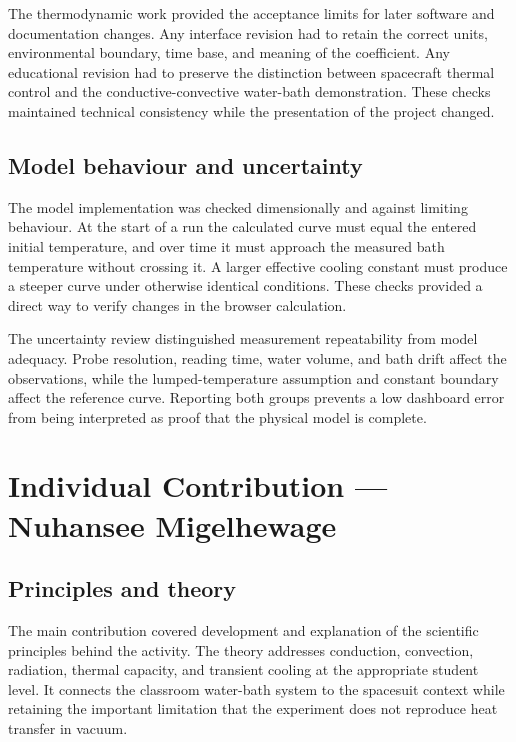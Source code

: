 \documentclass[10pt,conference,a4paper]{IEEEtran}
\begin{document}
The thermodynamic work provided the acceptance limits for later software and documentation changes. Any interface revision had to retain the correct units, environmental boundary, time base, and meaning of the coefficient. Any educational revision had to preserve the distinction between spacecraft thermal control and the conductive-convective water-bath demonstration. These checks maintained technical consistency while the presentation of the project changed.

\subsection*{Model behaviour and uncertainty}

The model implementation was checked dimensionally and against limiting behaviour. At the start of a run the calculated curve must equal the entered initial temperature, and over time it must approach the measured bath temperature without crossing it. A larger effective cooling constant must produce a steeper curve under otherwise identical conditions. These checks provided a direct way to verify changes in the browser calculation.

The uncertainty review distinguished measurement repeatability from model adequacy. Probe resolution, reading time, water volume, and bath drift affect the observations, while the lumped-temperature assumption and constant boundary affect the reference curve. Reporting both groups prevents a low dashboard error from being interpreted as proof that the physical model is complete.

\endgroup

\begingroup\normalsize\setlength{\parskip}{2pt}

\section*{Individual Contribution --- Nuhansee Migelhewage}

\subsection*{Principles and theory}

The main contribution covered development and explanation of the scientific principles behind the activity. The theory addresses conduction, convection, radiation, thermal capacity, and transient cooling at the appropriate student level. It connects the classroom water-bath system to the spacesuit context while retaining the important limitation that the experiment does not reproduce heat transfer in vacuum.
\end{document}
